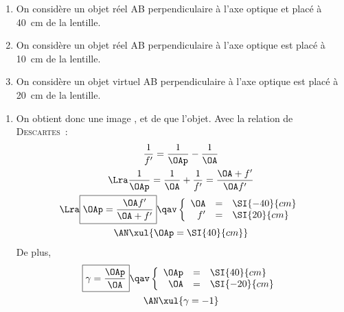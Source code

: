 \documentclass[a4paper, 10pt, garamond, oneside]{book}
\begin{document}
{	\begin{enumerate}
		\item On considère un objet réel AB perpendiculaire à l'axe optique et placé
		      à \SI{40}{cm} de la lentille.
		\item On considère un objet réel AB perpendiculaire à l'axe optique est
		      placé à \SI{10}{cm} de la lentille.
		\item On considère un objet virtuel AB perpendiculaire à l'axe optique est
		      placé à \SI{20}{cm} de la lentille.
	\end{enumerate}
}{
	\begin{enumerate}
		\item
		      \noindent
		      \begin{minipage}[t]{.48\linewidth}
			      On obtient donc une image ,  et de
			       que l'objet. Avec la relation de
			      \textsc{Descartes}~:
			      \begin{gather*}
				      \frac{1}{f'} =  \frac{1}{\OAp}-\frac{1}{\OA}
				      \\\Lra
				      \frac{1}{\OAp} = \frac{1}{\OA}+\frac{1}{f'}= \frac{\OA+f'}{\OA f'}
				      \\\Lra
				      \boxed{\OAp = \frac{\OA f'}{\OA+f'}}
				      \qav
				      \left\{
				      \begin{array}{rcl}
					      \OA & = & \SI{-40}{cm}
					      \\
					      f'  & = & \SI{20}{cm}
				      \end{array}
				      \right.\\
				      \AN
				      \xul{
					      \OAp = \SI{40}{cm}
				      }
			      \end{gather*}
			      De plus,
			      \begin{gather*}
				      \boxed{\gamma = \frac{\OAp}{\OA}}
				      \qav
				      \left\{
				      \begin{array}{rcl}
					      \OAp & = & \SI{40}{cm}
					      \\
					      \OA  & = & \SI{-20}{cm}
				      \end{array}
				      \right.\\
				      \AN
				      \xul{
					      \gamma = -1
				      }
			      \end{gather*}
		      \end{minipage}
		      \hfill
		      \begin{minipage}[t]{.48\linewidth}
			      ~
			      \begin{center}

\end{center}
\end{minipage}
\end{enumerate}}
\end{document}

